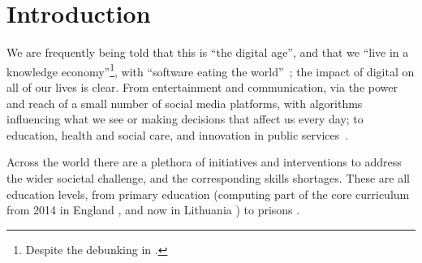 \documentclass[sigconf]{acmart}
\begin{document}

\maketitle


\section{Introduction}

We are frequently being told that this is ``the digital age'', and
that we ``live in a knowledge economy''\footnote{Despite the debunking
in \cite{Friesen2008}.}, with ``software eating the
world''~\cite{andreessen:2011}; the impact of digital on all of our
lives is clear. From entertainment and communication, via the power
and reach of a small number of social media platforms, with algorithms
influencing what we see or making decisions that affect us every day;
to education, health and social care, and innovation in public
services~\cite{ecdsmsuk:2018}.

Across the world there are a plethora of initiatives and interventions
to address the wider societal challenge, and the corresponding skills
shortages. These are all education levels, from primary education
(computing part of the core curriculum from 2014 in England
\cite{brown-et-al:sigcse2013,DfE2013a}, and now in Lithuania
\cite{Xinhua2018a}) to prisons \cite{Maher2018a}.
\end{document}
